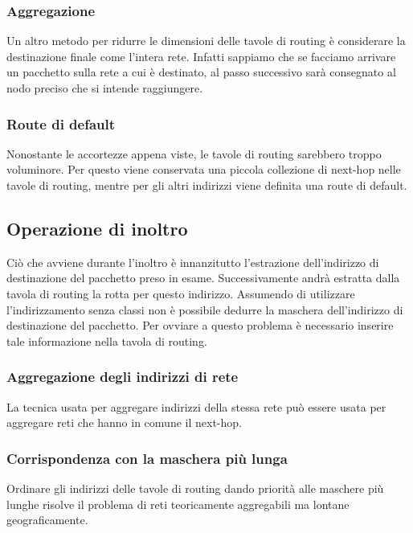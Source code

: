         \subsubsection{Aggregazione}
            Un altro metodo per ridurre le dimensioni delle tavole di routing è considerare la destinazione finale come l'intera rete. Infatti sappiamo che se facciamo arrivare un pacchetto sulla rete a cui è destinato, al passo successivo sarà consegnato al nodo preciso che si intende raggiungere.
            
        \subsubsection{Route di default}
            Nonostante le accortezze appena viste, le tavole di routing sarebbero troppo voluminore. Per questo viene conservata una piccola collezione di next-hop nelle tavole di routing, mentre per gli altri indirizzi viene definita una route di default.
            
    \subsection{Operazione di inoltro}
        Ciò che avviene durante l'inoltro è innanzitutto l'estrazione dell'indirizzo di destinazione del pacchetto preso in esame. Successivamente andrà estratta dalla tavola di routing la rotta per questo indirizzo. Assumendo di utilizzare l'indirizzamento senza classi non è possibile dedurre la maschera dell'indirizzo di destinazione del pacchetto. Per ovviare a questo problema è necessario inserire tale informazione nella tavola di routing. 
        
        \subsubsection{Aggregazione degli indirizzi di rete}
            La tecnica usata per aggregare indirizzi della stessa rete può essere usata per aggregare reti che hanno in comune il next-hop.
            
        \subsubsection{Corrispondenza con la maschera più lunga}
            Ordinare gli indirizzi delle tavole di routing dando priorità alle maschere più lunghe risolve il problema di reti teoricamente aggregabili ma lontane geograficamente.
        
